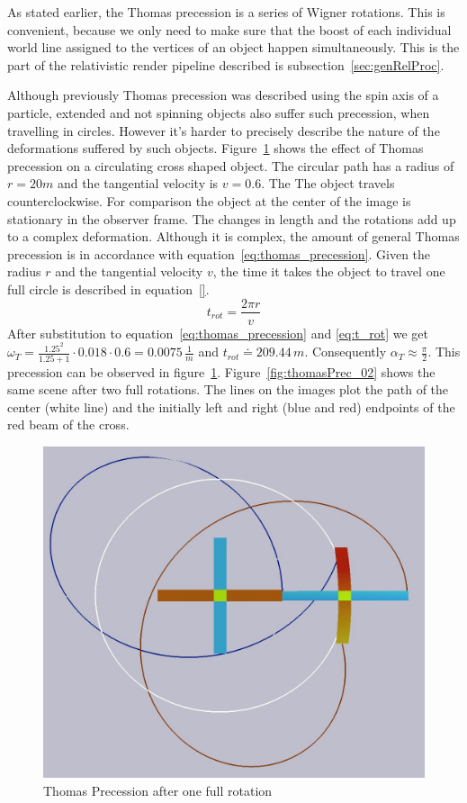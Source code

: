 \documentclass{egpubl}
\begin{document}
As stated earlier, the Thomas precession is a series of Wigner rotations. This is convenient, because we only need to make sure that the boost of each individual world line assigned to the vertices of an object happen simultaneously. This is the part of the relativistic render pipeline described is subsection~\ref{sec:genRelProc}.

Although previously Thomas precession was described using the spin axis of a particle, extended and not spinning objects also suffer such precession, when travelling in circles. However it's harder to precisely describe the nature of the deformations suffered by such objects. Figure~\ref{fig:thomasPrec_01} shows the effect of Thomas precession on a circulating cross shaped object. The circular path has a radius of $r=20m$ and the tangential velocity is $v=0.6$. The The object travels counterclockwise. For comparison the object at the center of the image is stationary in the observer frame. The changes in length and the rotations add up to a complex deformation. Although it is complex, the amount of general Thomas precession is in accordance with equation~\ref{eq:thomas_precession}. Given the radius $r$ and the tangential velocity $v$, the time it takes the object to travel one full circle is described in equation~\ref{}.
\begin{equation}
t_{rot}=\frac{2\pi{}r}{v}
\label{eq:t_rot}
\end{equation}
After substitution to equation~\ref{eq:thomas_precession} and \ref{eq:t_rot} we get $\omega_T=\frac{1.25^2}{1.25+1}\cdot{}0.018\cdot{}0.6=0.0075\,\frac{1}{m}$ and $t_{rot} \doteq 209.44\,{}m$. Consequently $\alpha{}_T \approx \frac{\pi}{2}$. This precession can be observed in figure~\ref{fig:thomasPrec_01}. Figure~\ref{fig:thomasPrec_02} shows the same scene after two full rotations. The lines on the images plot the path of the center (white line) and the initially left and right (blue and red) endpoints of the red beam of the cross.
\begin{figure}[htb]
\centering
\includegraphics[width=0.8\linewidth]{figures/v06_r20_1rot_path.jpg}
\caption{Thomas Precession after one full rotation}
	\label{fig:thomasPrec_01}
\end{figure}
\end{document}
